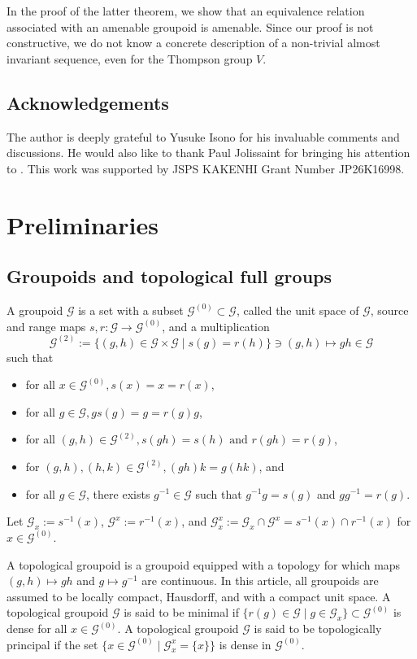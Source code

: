 \documentclass{amsart}
\newcommand{\G}{\mathcal{G}}
\theoremstyle{remark}
\theoremstyle{definition}
\begin{document}
In the proof of the latter theorem, we show that an equivalence relation associated with an amenable groupoid is amenable.
Since our proof is not constructive, we do not know a concrete description of a non-trivial almost invariant sequence, even for the Thompson group $V$.


\subsection*{Acknowledgements}
The author is deeply grateful to Yusuke Isono for his invaluable comments and discussions.
He would also like to thank Paul Jolissaint for bringing his attention to \cite{Jolissaint, Jolissaint2}.
This work was supported by JSPS KAKENHI Grant Number JP26K16998.

\section{Preliminaries}
\subsection{Groupoids and topological full groups}
A groupoid $\G$ is a set with a subset $\G^{(0)} \subset \G$, called the unit space of $\G$, source and range maps $s, r \colon \G \to \G^{(0)}$, and a multiplication
\[
\G^{(2)} := \{ (g, h) \in \G \times \G \mid s(g) = r(h) \} \ni (g, h) \mapsto gh \in \G
\]
such that 
\begin{itemize}
\item for all $x \in \G^{(0)}, s(x) = x = r(x)$,
\item for all $g \in \G, gs(g) = g = r(g)g$,
\item for all $(g, h) \in \G^{(2)}, s(gh)=s(h)\text{ and }r(gh)=r(g)$,
\item for $(g, h), (h, k) \in \G^{(2)}, (gh)k = g(hk)$, and
\item for all $g \in \G$, there exists $g^{-1} \in \G$ such that $g^{-1} g = s(g)$ and $g g^{-1} = r(g).$ 
\end{itemize}
Let $\G _x := s^{-1}(x)$, $\G ^x := r^{-1}(x)$, and $\G _x^x := \G _x \cap \G ^x = s^{-1}(x) \cap r^{-1}(x)$ for $x \in \G ^{(0)}$.

A topological groupoid is a groupoid equipped with a topology for which maps $(g, h) \mapsto gh$ and $g \mapsto g^{-1}$ are continuous.
In this article, all groupoids are assumed to be locally compact, Hausdorff, and with a compact unit space.
A topological groupoid $\G$ is said to be minimal if $\{ r(g) \in \G \mid g \in \G _x \} \subset \G^{(0)}$ is dense for all $x \in \G^{(0)}$.
A topological groupoid $\G$ is said to be topologically principal if the set $\{ x \in \G^{(0)} \mid \G _x^x = \{ x \} \}$ is dense in $\G ^{(0)}$.
\end{document}
